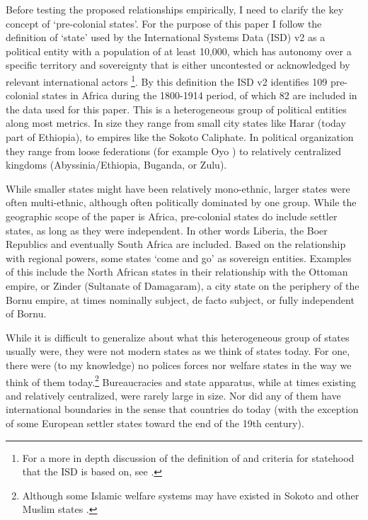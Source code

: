 \documentclass[12pt]{article}
\begin{document}
Before testing the proposed relationships empirically, I need to clarify the key
concept of `pre-colonial states'. For the purpose of this paper I follow the
definition of `state' used by the International Systems Data (ISD) v2
\citep{Butcher2020} as a political entity with a population of at least 10,000,
which has autonomy over a specific territory and sovereignty that is either
uncontested or acknowledged by relevant international actors
\citep{Butcher2020}\footnote{For a more in depth discussion of the definition of
and criteria for statehood that the ISD is based on, see \citet{Butcher2017}.}.
By this definition the ISD v2 identifies 109 pre-colonial states in Africa
during the 1800-1914 period, of which 82 are included in the data used for this
paper. This is a heterogeneous group of political entities along most metrics.
In size they range from small city states like Harar (today part of Ethiopia),
to empires like the Sokoto Caliphate. In political organization they range from
loose federations (for example Oyo \citep{Law1977}) to relatively centralized
kingdoms (Abyssinia/Ethiopia, Buganda, or Zulu).

While smaller states might have been relatively mono-ethnic, larger states were
often multi-ethnic, although often politically dominated by one group. While the
geographic scope of the paper is Africa, pre-colonial states do include settler
states, as long as they were independent. In other words Liberia, the Boer
Republics and eventually South Africa are included. Based on the relationship
with regional powers, some states `come and go' as sovereign entities. Examples
of this include the North African states in their relationship with the Ottoman
empire, or Zinder (Sultanate of Damagaram), a city state on the periphery of the
Bornu empire, at times nominally subject, de facto subject, or fully independent
of Bornu.

While it is difficult to generalize about what this heterogeneous group of
states usually were, they were not modern states as we think of states today.
For one, there were (to my knowledge) no polices forces nor welfare states in
the way we think of them today.\footnote{Although some Islamic welfare systems
may have existed in Sokoto \citep{Buba_2018} and other Muslim states
\citep{WeissHolger2002SwiM}.} Bureaucracies and state apparatus, while at times
existing and relatively centralized, were rarely large in size. Nor did
any of them have international boundaries in the sense that countries do today
(with the exception of some European settler states toward the end of the 19th
century). 
\end{document}
